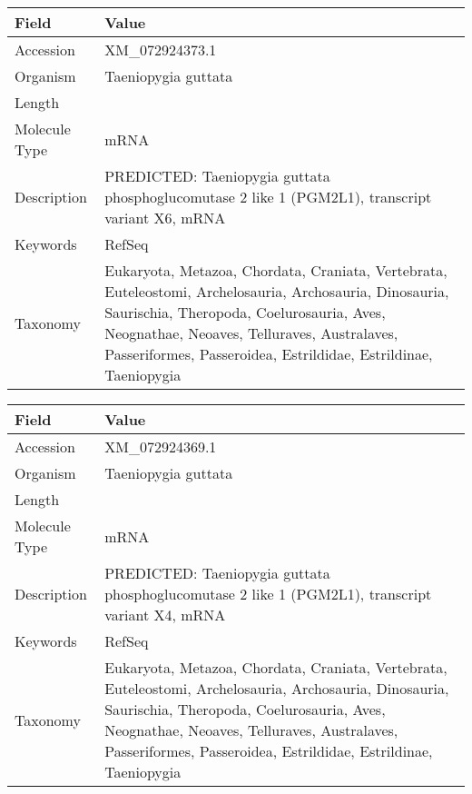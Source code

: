 \documentclass[10pt]{article}
\begin{document}
\vspace{1em}
{\footnotesize
\begin{longtable}{>{\raggedright\arraybackslash}p{4.5cm} >{\raggedright\arraybackslash}p{11.5cm}}
\textbf{Field} & \textbf{Value} \\
\hline
Accession & XM\_072924373.1 \\
Organism & Taeniopygia guttata \\
Length & 6128 \\
Molecule Type & mRNA \\
Description & PREDICTED: Taeniopygia guttata phosphoglucomutase 2 like 1 (PGM2L1), transcript variant X6, mRNA \\
Keywords & RefSeq \\
Taxonomy & Eukaryota, Metazoa, Chordata, Craniata, Vertebrata, Euteleostomi, Archelosauria, Archosauria, Dinosauria, Saurischia, Theropoda, Coelurosauria, Aves, Neognathae, Neoaves, Telluraves, Australaves, Passeriformes, Passeroidea, Estrildidae, Estrildinae, Taeniopygia \\
\end{longtable}
}

\vspace{1em}
{\footnotesize
\begin{longtable}{>{\raggedright\arraybackslash}p{4.5cm} >{\raggedright\arraybackslash}p{11.5cm}}
\textbf{Field} & \textbf{Value} \\
\hline
Accession & XM\_072924369.1 \\
Organism & Taeniopygia guttata \\
Length & 5771 \\
Molecule Type & mRNA \\
Description & PREDICTED: Taeniopygia guttata phosphoglucomutase 2 like 1 (PGM2L1), transcript variant X4, mRNA \\
Keywords & RefSeq \\
Taxonomy & Eukaryota, Metazoa, Chordata, Craniata, Vertebrata, Euteleostomi, Archelosauria, Archosauria, Dinosauria, Saurischia, Theropoda, Coelurosauria, Aves, Neognathae, Neoaves, Telluraves, Australaves, Passeriformes, Passeroidea, Estrildidae, Estrildinae, Taeniopygia \\
\end{longtable}
}
\end{document}

